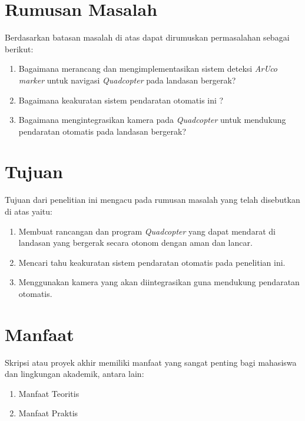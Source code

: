 \section{Rumusan Masalah}
Berdasarkan batasan masalah di atas dapat dirumuskan
permasalahan sebagai berikut:
\begin{enumerate}
	\item Bagaimana merancang dan mengimplementasikan sistem deteksi \textit{ArUco marker} untuk navigasi \textit{Quadcopter} pada landasan bergerak?
	\item Bagaimana keakuratan sistem pendaratan otomatis ini ?
	\item Bagaimana mengintegrasikan kamera pada \textit{Quadcopter} untuk mendukung pendaratan otomatis pada landasan bergerak? 
\end{enumerate}

\section{Tujuan}
Tujuan dari penelitian ini mengacu pada rumusan masalah yang telah disebutkan di atas yaitu:

\begin{enumerate}
	\item Membuat rancangan dan program \textit{Quadcopter} yang dapat mendarat di landasan yang bergerak secara otonom dengan aman dan lancar.
	\item Mencari tahu keakuratan sistem pendaratan otomatis pada penelitian ini.
	\item Menggunakan kamera yang akan diintegrasikan guna mendukung pendaratan otomatis.
\end{enumerate}

\section{Manfaat}
Skripsi atau proyek akhir memiliki manfaat yang sangat penting bagi mahasiswa dan lingkungan akademik, antara lain:
\begin{enumerate}
	\item Manfaat Teoritis
	\item Manfaat Praktis
\end{enumerate}
